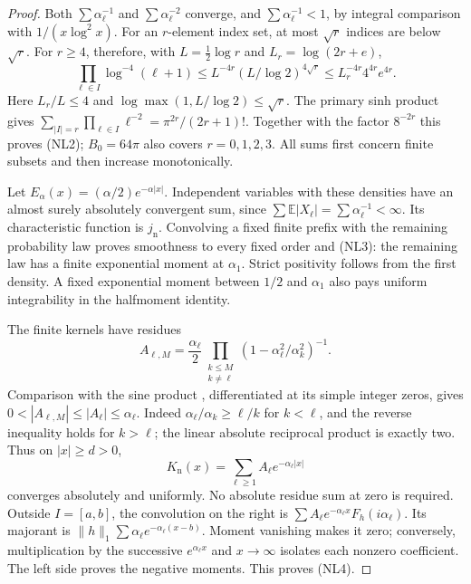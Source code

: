 \documentclass[11pt]{article}
\theoremstyle{remark}\newtheorem{remark}[theorem]{Remark}
\begin{document}
\begin{proof}
Both \(\sum\alpha_\ell^{-1}\) and \(\sum\alpha_\ell^{-2}\)
converge, and
\(\sum\alpha_\ell^{-1}<1\), by integral comparison with
\(1/(x\log^2x)\). For an \(r\)-element index set, at most
\(\sqrt r\) indices are below \(\sqrt r\). For \(r\ge4\), therefore,
with \(L=\tfrac12\log r\) and \(L_r=\log(2r+e)\),
\[
 \prod_{\ell\in I}\log^{-4}(\ell+1)
 \le L^{-4r}(L/\log2)^{4\sqrt r}
 \le L_r^{-4r}4^{4r}e^{4r}.
\]
Here \(L_r/L\le4\) and
\(\log\max(1,L/\log2)\le\sqrt r\). The primary sinh product
\cite[4.36.1]{DLMF} gives
\(\sum_{|I|=r}\prod_{\ell\in I}\ell^{-2}
 =\pi^{2r}/(2r+1)!\).
Together with the factor \(8^{-2r}\) this proves (NL2);
\(B_0=64\pi\) also covers \(r=0,1,2,3\).
All sums first concern finite subsets and then increase monotonically.

Let \(E_\alpha(x)=(\alpha/2)e^{-\alpha|x|}\).
Independent variables with these densities have an almost surely
absolutely convergent sum, since
\(\sum\mathbb E|X_\ell|=\sum\alpha_\ell^{-1}<\infty\).
Its characteristic function is \(j_{\mathrm n}\).
Convolving a fixed finite prefix with the remaining probability
law proves smoothness to every fixed order and (NL3):
the remaining law has a finite exponential moment at \(\alpha_1\).
Strict positivity follows from the first density.
A fixed exponential moment between \(1/2\) and \(\alpha_1\)
also pays uniform integrability in the halfmoment identity.

The finite kernels have residues
\[
 A_{\ell,M}=\frac{\alpha_\ell}{2}
       \prod_{\substack{k\le M\\k\ne\ell}}
                     (1-\alpha_\ell^2/\alpha_k^2)^{-1}.
\]
Comparison with the sine product
\cite[4.22.1]{DLMF}, differentiated at its simple integer zeros,
gives \(0<|A_{\ell,M}|\le|A_\ell|\le\alpha_\ell\).
Indeed \(\alpha_\ell/\alpha_k\ge\ell/k\) for \(k<\ell\),
and the reverse inequality holds for \(k>\ell\); the linear
absolute reciprocal product is exactly two.
Thus on \(|x|\ge d>0\),
\[
 K_{\mathrm n}(x)=\sum_{\ell\ge1}A_\ell e^{-\alpha_\ell|x|}
\]
converges absolutely and uniformly. No absolute residue sum at
zero is required. Outside \(I=[a,b]\), the convolution on the right
is \(\sum A_\ell e^{-\alpha_\ell x}F_h(i\alpha_\ell)\).
Its majorant is \(\|h\|_1\sum\alpha_\ell
 e^{-\alpha_\ell(x-b)}\).
Moment vanishing makes it zero; conversely, multiplication by
the successive \(e^{\alpha_\ell x}\) and \(x\to\infty\)
isolates each nonzero coefficient. The left side proves the
negative moments. This proves (NL4).


\end{proof}
\end{document}
